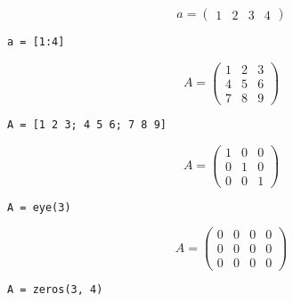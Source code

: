 \documentclass
[
  fontsize = 11pt,
  parskip  = half-,
  BCOR     = 0pt,
  DIV      = 11,
  ngerman
]
{scrartcl}
\begin{document}
\begin{minipage}{\mw}%
  \begin{equation*}
    a=\begin{pmatrix}
        1 & 2 & 3 & 4
      \end{pmatrix}%
  \end{equation*}
\end{minipage}%
\hfill
\begin{minipage}{\cw}%
\begin{verbatim}
a = [1:4]
\end{verbatim}
\end{minipage}\bigskip

\begin{minipage}{\mw}
  \begin{equation*}
    A=\begin{pmatrix}
        1 & 2 & 3 \\
        4 & 5 & 6 \\
        7 & 8 & 9
      \end{pmatrix}
  \end{equation*}
\end{minipage}%
\hfill
\begin{minipage}{\cw}
\begin{verbatim}
A = [1 2 3; 4 5 6; 7 8 9]
\end{verbatim}
\end{minipage}\bigskip

\begin{minipage}{\mw}
  \begin{equation*}
    A=\begin{pmatrix}
        1 & 0 & 0 \\
        0 & 1 & 0 \\
        0 & 0 & 1
    \end{pmatrix}
  \end{equation*}
\end{minipage}%
\hfill
\begin{minipage}{\cw}
\begin{verbatim}
A = eye(3)
\end{verbatim}
\end{minipage}\bigskip

\begin{minipage}{\mw}
  \begin{equation*}
    A=\begin{pmatrix}
        0 & 0 & 0 & 0 \\
        0 & 0 & 0 & 0 \\
        0 & 0 & 0 & 0
      \end{pmatrix}
  \end{equation*}
\end{minipage}%
\hfill
\begin{minipage}{\cw}
\begin{verbatim}
A = zeros(3, 4)
\end{verbatim}
\end{minipage}\bigskip
\end{document}
